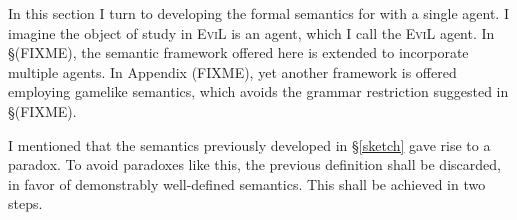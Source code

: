 In this section I turn to developing the formal semantics for  with a single agent.  I imagine the object of study in \textsc{EviL} is an agent, which I call the \textsc{EviL} agent.  In \S(FIXME), the semantic framework offered here is extended to incorporate multiple agents. In Appendix (FIXME), yet another framework is offered employing gamelike semantics, which avoids the grammar restriction suggested in \S(FIXME).  %

I mentioned that the semantics previously developed in \S\ref{sketch}
gave rise to a paradox.  To avoid paradoxes like this, the previous definition shall be discarded, in favor of demonstrably well-defined semantics.  This shall be achieved in two steps.

